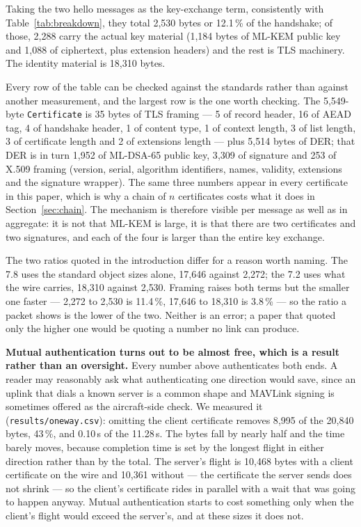 \documentclass[drones,article,submit,pdftex,moreauthors]{Definitions/mdpi}
\newcommand{\mlkem}{ML-KEM}
\newcommand{\mldsa}{ML-DSA}
\newcommand{\mav}{MAVLink}
\newcommand{\tls}{TLS}
\begin{document}
Taking the two hello messages as the key-exchange term, consistently
with Table~\ref{tab:breakdown}, they total 2{,}530 bytes or 12.1\,\%
of the handshake; of those, 2{,}288 carry the actual key material
(1{,}184 bytes of \mlkem{} public key and 1{,}088 of ciphertext, plus
extension headers) and the rest is \tls{} machinery. The identity
material is 18{,}310 bytes.

Every row of the table can be checked against the standards rather than
against another measurement, and the largest row is the one worth
checking. The 5{,}549-byte \texttt{Certificate} is 35 bytes of \tls{}
framing --- 5 of record header, 16 of AEAD tag, 4 of handshake header, 1
of content type, 1 of context length, 3 of list length, 3 of certificate
length and 2 of extensions length --- plus 5{,}514 bytes of DER; that
DER is in turn 1{,}952 of \mldsa{}-65 public key, 3{,}309 of signature
and 253 of X.509 framing (version, serial, algorithm identifiers, names,
validity, extensions and the signature wrapper). The same three numbers
appear in every certificate in this paper, which is why a chain of $n$
certificates costs what it does in Section~\ref{sec:chain}. The
mechanism is therefore visible per message as well as in aggregate: it
is not that \mlkem{} is large, it is that there are two certificates and
two signatures, and each of the four is larger than the entire key
exchange.

The two ratios quoted in the introduction differ for a reason worth
naming. The 7.8 uses the standard object sizes alone, 17{,}646 against
2{,}272; the 7.2 uses what the wire carries, 18{,}310 against 2{,}530.
Framing raises both terms but the smaller one faster --- 2{,}272 to
2{,}530 is 11.4\,\%, 17{,}646 to 18{,}310 is 3.8\,\% --- so the ratio
a packet shows is the lower of the two. Neither is an error; a paper
that quoted only the higher one would be quoting a number no link can
produce.

\textbf{Mutual authentication turns out to be almost free, which is a
result rather than an oversight.} Every number above authenticates both
ends. A reader may reasonably ask what authenticating one direction
would save, since an uplink that dials a known server is a common shape
and \mav{} signing is sometimes offered as the aircraft-side check. We
measured it (\texttt{results/oneway.csv}): omitting the client
certificate removes 8{,}995 of the 20{,}840 bytes, 43\,\%, and 0.10\,s
of the 11.28\,s. The bytes fall by nearly half and the time barely
moves, because completion time is set by the longest flight in either
direction rather than by the total. The server's flight is 10{,}468
bytes with a client certificate on the wire and 10{,}361 without --- the
certificate the server sends does not shrink --- so the client's
certificate rides in parallel with a wait that was going to happen
anyway. Mutual authentication starts to cost something only when the
client's flight would exceed the server's, and at these sizes it does
not.
\end{document}
